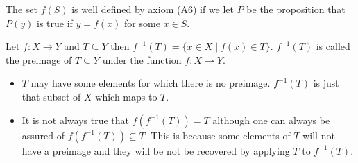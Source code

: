 The set $f(S)$ is well defined by axiom (A6) if we let $P$ be the 
proposition that $P(y)$ is true if $y = f(x)$ for some $x \in S$.

\begin{defn}\label{c2s4d2}
Let $f: X \rightarrow Y$ and $T \subseteq Y$ then $f^{-1}(T) = \{x \in X
\;|\; f(x) \in T\}$. $f^{-1}(T)$ is called the preimage of $T \subseteq
Y$ under the function $f: X \rightarrow Y$.
\end{defn}
\begin{itemize}
\item $T$ may have some elements for which there is no preimage. 
$f^{-1}(T)$ is just that subset of $X$ which maps to $T$.
\item It is not always true that $f(f^{-1}(T)) = T$ although one can always
be assured of $f(f^{-1}(T)) \subseteq T$. This is because some elements of
$T$ will not have a preimage and they will be not be recovered by applying
$T$ to $f^{-1}(T)$.
\end{itemize}

